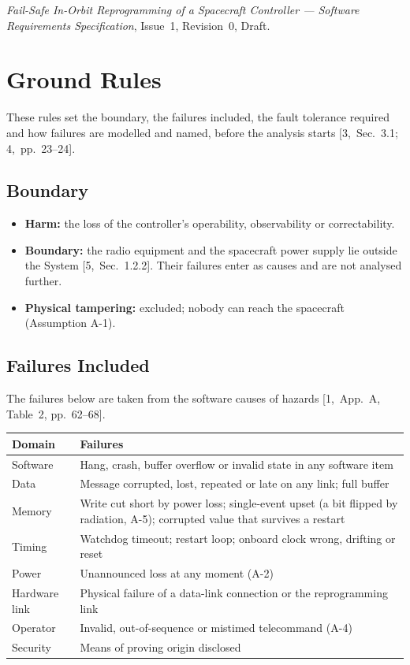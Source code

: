 \documentclass[11pt,a4paper]{article}
\begin{document}
\noindent [11] \emph{Fail-Safe In-Orbit Reprogramming of a Spacecraft
Controller --- Software Requirements Specification}, Issue~1, Revision~0,
Draft.

\section{Ground Rules}
These rules set the boundary, the failures included, the fault tolerance
required and how failures are modelled and named, before the analysis starts
[3,~Sec.~3.1; 4,~pp.~23--24].

\subsection{Boundary}
\begin{itemize}
\item \textbf{Harm:} the loss of the controller's operability, observability
  or correctability.
\item \textbf{Boundary:} the radio equipment and the spacecraft power supply lie
  outside the System [5,~Sec.~1.2.2]. Their failures enter as causes and are
  not analysed further.
\item \textbf{Physical tampering:} excluded; nobody can reach the spacecraft
  (Assumption A-1).
\end{itemize}

\subsection{Failures Included}
The failures below are taken from the software causes of hazards
[1,~App.~A, Table~2, pp.~62--68].

\begin{table}[H]
\centering
\begin{tabularx}{\textwidth}{@{}l>{\raggedright\arraybackslash}X@{}}
\toprule
Domain & Failures \\
\midrule
Software & Hang, crash, buffer overflow or invalid state in any software item \\
Data & Message corrupted, lost, repeated or late on any link; full buffer \\
Memory & Write cut short by power loss; single-event upset (a bit flipped by
  radiation, A-5); corrupted value that survives a restart \\
Timing & Watchdog timeout; restart loop; onboard clock wrong, drifting or reset \\
Power & Unannounced loss at any moment (A-2) \\
Hardware link & Physical failure of a data-link connection or the
  reprogramming link \\
Operator & Invalid, out-of-sequence or mistimed telecommand (A-4) \\
Security & Means of proving origin disclosed \\
\bottomrule
\end{tabularx}
\end{table}
\end{document}
